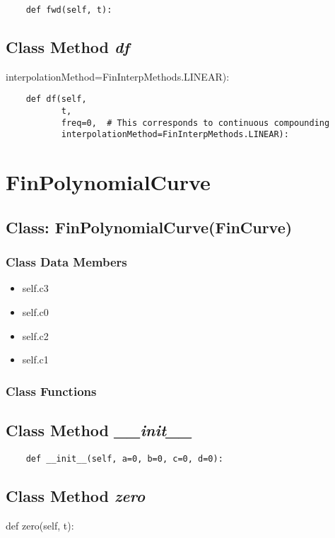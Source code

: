 \documentclass[twoside,11pt]{book}
\begin{document}
\begin{lstlisting}
    def fwd(self, t):
\end{lstlisting}

\subsection{Class Method {\it df}}
interpolationMethod=FinInterpMethods.LINEAR):

\begin{lstlisting}
    def df(self,
           t,
           freq=0,  # This corresponds to continuous compounding
           interpolationMethod=FinInterpMethods.LINEAR):
\end{lstlisting}

\newpage
\section{FinPolynomialCurve}

\subsection{Class: FinPolynomialCurve(FinCurve)}


\subsubsection{Class Data Members}
\begin{itemize}
\item{self.c3}
\item{self.c0}
\item{self.c2}
\item{self.c1}
\end{itemize}

\subsubsection{Class Functions}

\subsection{Class Method {\it \_\_init\_\_}}


\begin{lstlisting}
    def __init__(self, a=0, b=0, c=0, d=0):
\end{lstlisting}

\subsection{Class Method {\it zero}}
def zero(self, t):
\end{document}
